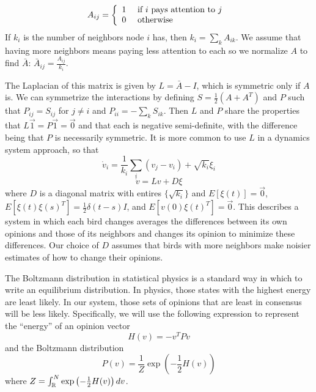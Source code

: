 \documentclass{article}
\begin{document}
\begin{equation}
A_{ij}=\left\{\begin{array}{l l l}
1 & \text{ if $i$ pays attention to $j$ }
\\0 & \text{ otherwise }
\end{array}\right.
\end{equation}
If $k_i$ is the number of neighbors node $i$ has, then $k_i=\sum_kA_{ik}$. We assume that having more neighbors means paying less attention to each so we normalize $A$ to find $\bar{A}$: $\bar{A}_{ij}=\frac{A_{ij}}{k_i}$.


The Laplacian of this matrix is given by $L=\bar{A}-I$, which is symmetric only if $A$ is.  We can symmetrize the interactions by defining $S=\frac{1}{2}(A+A^T)$ and $P$ such that $P_{ij}=S_{ij}$ for $j\neq i$ and $P_{ii}=-\sum_kS_{ik}$. Then $L$ and $P$ share the properties that $L\vec{1}=P\vec{1}=\vec{0}$ and that each is negative semi-definite, with the difference being that $P$ is necessarily symmetric.  It is more common to use $L$ in a dynamics system approach, so that 
\begin{equation}
\dot{v}_i=\frac{1}{k_i}\sum_i\left(v_j-v_i\right)+\sqrt{k_i}\xi_i
\end{equation}
\begin{equation}
\dot{v}=Lv+D\xi \label{opinion_dynamics}
\end{equation} 
where $D$ is a diagonal matrix with entires $\{\sqrt{k_i}\}$ and $E[\xi(t)]=\vec{0}$, $E[\xi(t)\xi(s)^T]=\frac{1}{2}\delta(t-s)I$, and $E[v(0)\xi(t)^T]=\vec{0}$. This describes a system in which each bird changes averages the differences between its own opinions and those of its neighbors and changes its opinion to minimize these differences. Our choice of $D$ assumes that birds with more neighbors make noisier estimates of how to change their opinions. 

The Boltzmann distribution in statistical physics is a standard way in which to write an equilibrium distribution. In physics, those states with the highest energy are least likely. In our system, those sets of opinions that are least in consensus will be less likely. Specifically, we will use the following expression to represent the ``energy'' of an opinion vector
\begin{equation}
H(v)=-v^TPv \label{Hamiltonian}
\end{equation}
and the Boltzmann distribution
\begin{equation}
P(v)=\frac{1}{Z}\exp\left(-\frac{1}{2}H(v)\right) \label{Boltzmann}
\end{equation}
where $Z=\int_{\mathbb{R}}^N\exp\left(-\frac{1}{2}H(v)\right)dv$.
\end{document}
